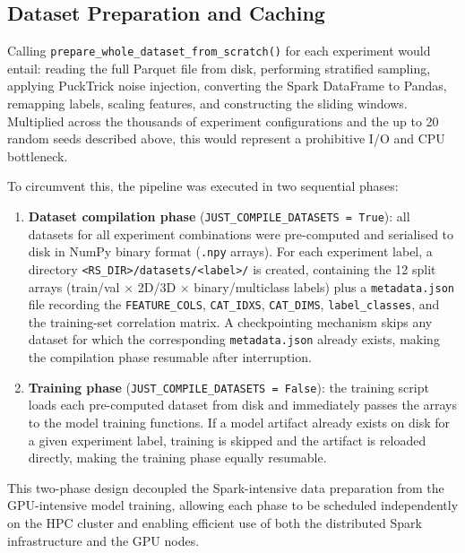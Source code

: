 \documentclass[../main.tex]{subfiles}
\begin{document}
\subsection{Dataset Preparation and Caching}
\label{sec:dataset-caching}

Calling \texttt{prepare\_whole\_dataset\_from\_scratch()} for each experiment would entail: reading the full Parquet file from disk, performing stratified sampling, applying PuckTrick noise injection, converting the Spark DataFrame to Pandas, remapping labels, scaling features, and constructing the sliding windows.  Multiplied across the thousands of experiment configurations and the up to 20 random seeds described above, this would represent a prohibitive I/O and CPU bottleneck.

To circumvent this, the pipeline was executed in two sequential phases:

\begin{enumerate}
    \item \textbf{Dataset compilation phase} (\texttt{JUST\_COMPILE\_DATASETS = True}): all datasets for all experiment combinations were pre-computed and serialised to disk in NumPy binary format (\texttt{.npy} arrays).  For each experiment label, a directory \texttt{<RS\_DIR>/datasets/<label>/} is created, containing the 12 split arrays (train/val $\times$ 2D/3D $\times$ binary/multiclass labels) plus a \texttt{metadata.json} file recording the \texttt{FEATURE\_COLS}, \texttt{CAT\_IDXS}, \texttt{CAT\_DIMS}, \texttt{label\_classes}, and the training-set correlation matrix.  A checkpointing mechanism skips any dataset for which the corresponding \texttt{metadata.json} already exists, making the compilation phase resumable after interruption.

    \item \textbf{Training phase} (\texttt{JUST\_COMPILE\_DATASETS = False}): the training script loads each pre-computed dataset from disk and immediately passes the arrays to the model training functions.  If a model artifact already exists on disk for a given experiment label, training is skipped and the artifact is reloaded directly, making the training phase equally resumable.
\end{enumerate}

This two-phase design decoupled the Spark-intensive data preparation from the GPU-intensive model training, allowing each phase to be scheduled independently on the HPC cluster and enabling efficient use of both the distributed Spark infrastructure and the GPU nodes.
\end{document}

